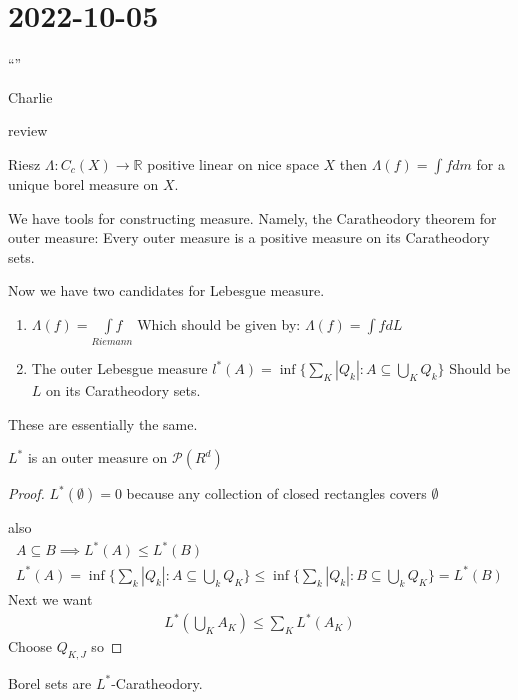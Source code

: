 \section{ 2022-10-05 }

\epigraph{``''}{Charlie}

review

\begin{theorem}
	Riesz $ \Lambda : C_c (X) \to \mathbb{R}$ positive linear on nice space $X$ then $\Lambda(f) = \int f dm$ for a unique borel measure on $X$.
\end{theorem}

We have tools for constructing measure. Namely, the Caratheodory theorem for outer measure: Every outer measure is a positive measure on its Caratheodory sets.

Now we have two candidates for Lebesgue measure.

\begin{enumerate}
	\item $\Lambda (f) = \underset{Riemann}{\int f}$
		Which should be given by: $\Lambda(f) = \int f dL$
	\item The outer Lebesgue measure  $l^* (A) = \inf\{\sum_K |Q_k| : A \subseteq \bigcup_{K} Q_k \}$ Should be $L$ on its Caratheodory sets.
\end{enumerate}

These are essentially the same.

\begin{lemma}
	$L^*$ is an outer measure on $\mathcal{P}(R^d)$
\end{lemma}

\begin{proof}
	$L^* (\emptyset)= 0$ because any collection of closed rectangles covers  $\emptyset$

	also
	 \begin{align*}
	A \subseteq B \implies L^*(A) \leq L^*(B) \\
	L^*(A) = \inf\{\sum_{k} |Q_k| : A \subseteq \bigcup_{k} Q_K \} \leq \inf\{\sum_{k} |Q_k| : B \subseteq \bigcup_{k} Q_K \} = L^*(B)
	\end{align*} 
	Next we want
	\begin{align*}
	L^*(\bigcup_{K} A_K) \leq \sum_{K} L^* (A_K)
	\end{align*} 
	Choose $Q_{K,J}$ so 

\end{proof}

\begin{lemma}
	Borel sets are $L^*$-Caratheodory.
\end{lemma}

